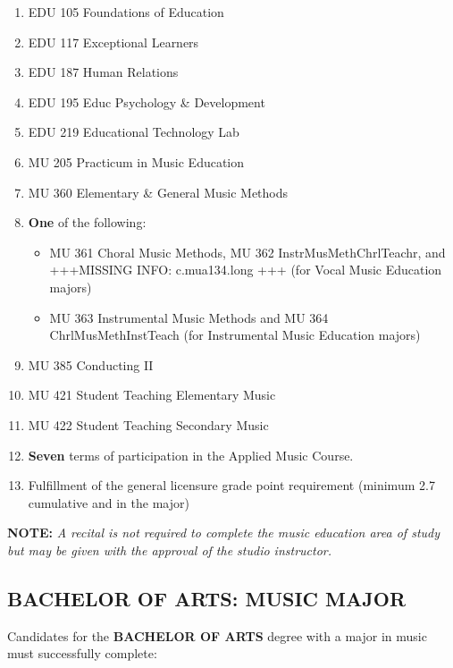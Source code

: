 \documentclass[
  letterpaper,
]{scrbook}
\providecommand{\tightlist}{%
  \setlength{\itemsep}{0pt}\setlength{\parskip}{0pt}}
\begin{document}
\begin{enumerate}
  \begin{enumerate}
  \def\labelenumii{\arabic{enumii}.}
  \tightlist
  \item
    EDU 105 Foundations of Education
  \item
    EDU 117 Exceptional Learners
  \item
    EDU 187 Human Relations
  \item
    EDU 195 Educ Psychology \& Development
  \item
    EDU 219 Educational Technology Lab
  \item
    MU 205 Practicum in Music Education
  \item
    MU 360 Elementary \& General Music Methods
  \item
    \textbf{One} of the following:

    \begin{itemize}
    \tightlist
    \item
      MU 361 Choral Music Methods, MU 362 InstrMusMethChrlTeachr, and
      +++MISSING INFO: c.mua134.long +++ (for Vocal Music Education
      majors)
    \item
      MU 363 Instrumental Music Methods and MU 364 ChrlMusMethInstTeach
      (for Instrumental Music Education majors)
    \end{itemize}
  \item
    MU 385 Conducting II
  \item
    MU 421 Student Teaching Elementary Music
  \item
    MU 422 Student Teaching Secondary Music
  \item
    \textbf{Seven} terms of participation in the Applied Music Course.
  \item
    Fulfillment of the general licensure grade point requirement
    (minimum 2.7 cumulative and in the major)
  \end{enumerate}
\end{enumerate}

\textbf{NOTE:} \emph{A recital is not required to complete the music
education area of study but may be given with the approval of the studio
instructor. }

\subsection{BACHELOR OF ARTS: MUSIC
MAJOR}\label{bachelor-of-arts-music-major}

Candidates for the \textbf{BACHELOR OF ARTS} degree with a major in
music must successfully complete:
\end{document}
